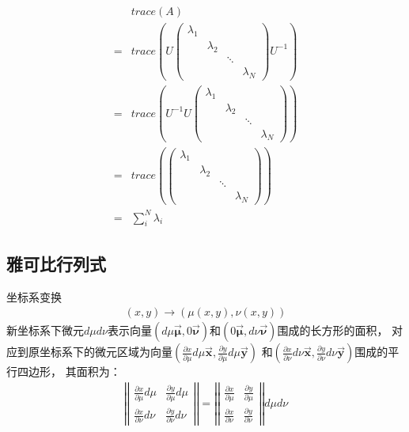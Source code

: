 \begin{align}
    &trace(A)\\
    =&trace(U
    \begin{pmatrix}
        \lambda_{1} &  &  & \\
         & \lambda_{2} &  & \\
         &  & \ddots & \\
         &  &  & \lambda_{N}
    \end{pmatrix}
    U^{-1})\\
    =&trace(U^{-1}U
    \begin{pmatrix}
        \lambda_{1} &  &  & \\
         & \lambda_{2} &  & \\
         &  & \ddots & \\
         &  &  & \lambda_{N}
    \end{pmatrix}
    )\\
    =&trace(
    \begin{pmatrix}
        \lambda_{1} &  &  & \\
         & \lambda_{2} &  & \\
         &  & \ddots & \\
         &  &  & \lambda_{N}
    \end{pmatrix}    
    )\\
    =&\sum_{i}^{N} \lambda_{i}
\end{align}

\subsection{雅可比行列式}

坐标系变换
\begin{gather}
    (x,y)\rightarrow (\mu(x,y),\nu(x,y))
\end{gather}
新坐标系下微元$d\mu d\nu$表示向量$(d\mu \bm{\overrightarrow{\mu}},0\bm{\overrightarrow{\nu}})$和$(0\bm{\overrightarrow{\mu}},d\nu \bm{\overrightarrow{\nu}})$围成的长方形的面积，
对应到原坐标系下的微元区域为向量$(\frac{\partial x}{\partial \mu}d\mu\bm{\overrightarrow{x}},\frac{\partial y}{\partial \mu}d\mu\bm{\overrightarrow{y}})$
和$(\frac{\partial x}{\partial \nu}d\nu\bm{\overrightarrow{x}},\frac{\partial y}{\partial \nu}d\nu\bm{\overrightarrow{y}})$围成的平行四边形，
其面积为：
\begin{gather}
    \left | \left |
    \begin{matrix}
        \frac{\partial x}{\partial \mu}d\mu & \frac{\partial y}{\partial \mu}d\mu\\
        \frac{\partial x}{\partial \nu}d\nu & \frac{\partial y}{\partial \nu}d\nu
    \end{matrix}
    \right | \right |
    =\left | \left |
    \begin{matrix}
        \frac{\partial x}{\partial \mu} & \frac{\partial y}{\partial \mu}\\
        \frac{\partial x}{\partial \nu} & \frac{\partial y}{\partial \nu}
    \end{matrix}
    \right | \right | d\mu d\nu
\end{gather}

